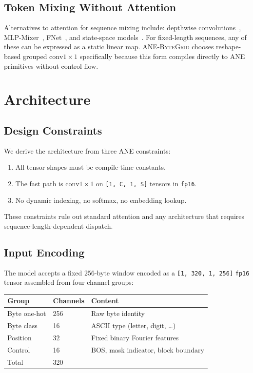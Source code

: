 \documentclass[10pt,twocolumn]{article}
\newcommand{\bytegrid}{\textsc{ANE-ByteGrid}}
\begin{document}
\subsection{Token Mixing Without Attention}

Alternatives to attention for sequence mixing include:
depthwise convolutions~\cite{TODO_wu_pay}, MLP-Mixer~\cite{TODO_tolstikhin},
FNet~\cite{TODO_lee2021}, and state-space models~\cite{TODO_gu_mamba}.
For fixed-length sequences, any of these can be expressed as a static linear
map.
\bytegrid{} chooses reshape-based grouped $\text{conv}1{\times}1$
specifically because this form compiles directly to ANE primitives without
control flow.

\section{Architecture}
\label{sec:architecture}

\subsection{Design Constraints}

We derive the architecture from three ANE constraints:
\begin{enumerate}
  \item All tensor shapes must be compile-time constants.
  \item The fast path is $\text{conv}1{\times}1$ on \texttt{[1,\,C,\,1,\,S]}
    tensors in \texttt{fp16}.
  \item No dynamic indexing, no softmax, no embedding lookup.
\end{enumerate}

These constraints rule out standard attention and any architecture that
requires sequence-length-dependent dispatch.

\subsection{Input Encoding}

The model accepts a fixed 256-byte window encoded as a
\texttt{[1,\,320,\,1,\,256]} \texttt{fp16} tensor assembled from four
channel groups:

\begin{center}
\begin{tabular}{lll}
\toprule
Group & Channels & Content \\
\midrule
Byte one-hot   & 256 & Raw byte identity \\
Byte class     & 16  & ASCII type (letter, digit, \ldots) \\
Position       & 32  & Fixed binary Fourier features \\
Control        & 16  & BOS, mask indicator, block boundary \\
\midrule
Total          & 320 & \\
\bottomrule
\end{tabular}
\end{center}
\end{document}
